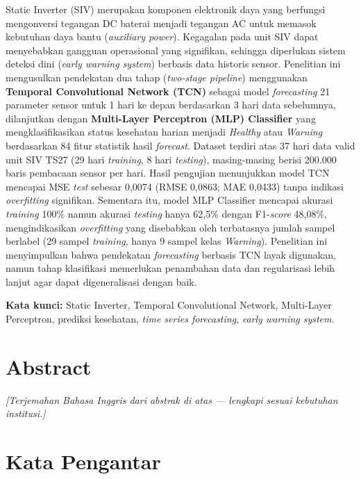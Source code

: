 \documentclass[12pt,a4paper]{report}
\begin{document}
\noindent Static Inverter (SIV) merupakan komponen elektronik daya yang berfungsi mengonversi tegangan DC baterai menjadi tegangan AC untuk memasok kebutuhan daya bantu (\textit{auxiliary power}). Kegagalan pada unit SIV dapat menyebabkan gangguan operasional yang signifikan, sehingga diperlukan sistem deteksi dini (\textit{early warning system}) berbasis data historis sensor. Penelitian ini mengusulkan pendekatan dua tahap (\textit{two-stage pipeline}) menggunakan \textbf{Temporal Convolutional Network (TCN)} sebagai model \textit{forecasting} 21 parameter sensor untuk 1 hari ke depan berdasarkan 3 hari data sebelumnya, dilanjutkan dengan \textbf{Multi-Layer Perceptron (MLP) Classifier} yang mengklasifikasikan status kesehatan harian menjadi \textit{Healthy} atau \textit{Warning} berdasarkan 84 fitur statistik hasil \textit{forecast}. Dataset terdiri atas 37 hari data valid unit SIV TS27 (29 hari \textit{training}, 8 hari \textit{testing}), masing-masing berisi 200.000 baris pembacaan sensor per hari. Hasil pengujian menunjukkan model TCN mencapai MSE \textit{test} sebesar 0,0074 (RMSE 0,0863; MAE 0,0433) tanpa indikasi \textit{overfitting} signifikan. Sementara itu, model MLP Classifier mencapai akurasi \textit{training} 100\% namun akurasi \textit{testing} hanya 62,5\% dengan F1-\textit{score} 48,08\%, mengindikasikan \textit{overfitting} yang disebabkan oleh terbatasnya jumlah sampel berlabel (29 sampel \textit{training}, hanya 9 sampel kelas \textit{Warning}). Penelitian ini menyimpulkan bahwa pendekatan \textit{forecasting} berbasis TCN layak digunakan, namun tahap klasifikasi memerlukan penambahan data dan regularisasi lebih lanjut agar dapat digeneralisasi dengan baik.

\vspace{0.5cm}
\noindent\textbf{Kata kunci:} Static Inverter, Temporal Convolutional Network, Multi-Layer Perceptron, prediksi kesehatan, \textit{time series forecasting}, \textit{early warning system}.

\chapter*{Abstract}
\noindent\textit{[Terjemahan Bahasa Inggris dari abstrak di atas — lengkapi sesuai kebutuhan institusi.]}

\chapter*{Kata Pengantar}
\end{document}
